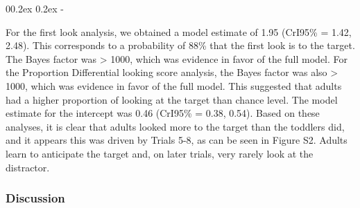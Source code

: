 \documentclass[
  english,
  man, donotrepeattitle,floatsintext]{apa6}
\makeatletter
\let\oldsubparagraph\subparagraph
\renewcommand{\subparagraph}[1]{\oldsubparagraph{#1}\mbox{}}
\renewcommand{\subparagraph}[1]{\@startsection{subparagraph}{5}{1em}%
  {0\baselineskip \@plus 0.2ex \@minus 0.2ex}%
  {-\z@\relax}%
  {\normalfont\normalsize\itshape\hspace{\parindent}{#1}\textit{\addperi}}{\relax}}
\makeatother
\begin{document}
\hypertarget{adults.}{%
\subparagraph{Adults.}\label{adults.}}

For the first look analysis, we obtained a model estimate of 1.95 (CrI95\% = 1.42, 2.48). This corresponds to a probability of 88\% that the first look is to the target. The Bayes factor was \textgreater{} 1000, which was evidence in favor of the full model. For the Proportion Differential looking score analysis, the Bayes factor was also \textgreater{} 1000, which was evidence in favor of the full model. This suggested that adults had a higher proportion of looking at the target than chance level. The model estimate for the intercept was 0.46 (CrI95\% = 0.38, 0.54). Based on these analyses, it is clear that adults looked more to the target than the toddlers did, and it appears this was driven by Trials 5-8, as can be seen in Figure S2. Adults learn to anticipate the target and, on later trials, very rarely look at the distractor.

\hypertarget{discussion}{%
\subsubsection{Discussion}\label{discussion}}
\end{document}
